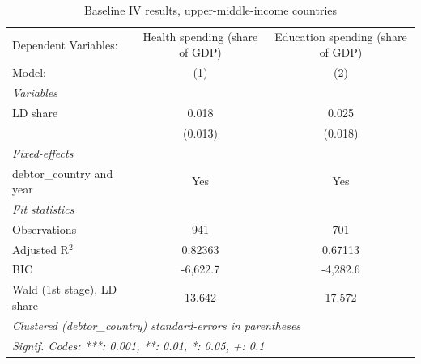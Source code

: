 
\begin{table}[htbp]
   \caption{\label{tab:iv_robustness_umics_only} Baseline IV results, upper-middle-income countries}
   \centering
   \begin{tabular}{lcc}
      \tabularnewline \midrule \midrule
      Dependent Variables:       & Health spending (share of GDP) & Education spending (share of GDP)\\  
      Model:                     & (1)                            & (2)\\  
      \midrule
      \emph{Variables}\\
      LD share                   & 0.018                          & 0.025\\   
                                 & (0.013)                        & (0.018)\\   
      \midrule
      \emph{Fixed-effects}\\
      debtor\_country and year   & Yes                            & Yes\\  
      \midrule
      \emph{Fit statistics}\\
      Observations               & 941                            & 701\\  
      Adjusted R$^2$             & 0.82363                        & 0.67113\\  
      BIC                        & -6,622.7                       & -4,282.6\\  
      Wald (1st stage), LD share & 13.642                         & 17.572\\  
      \midrule \midrule
      \multicolumn{3}{l}{\emph{Clustered (debtor\_country) standard-errors in parentheses}}\\
      \multicolumn{3}{l}{\emph{Signif. Codes: ***: 0.001, **: 0.01, *: 0.05, +: 0.1}}\\
   \end{tabular}
\end{table}


